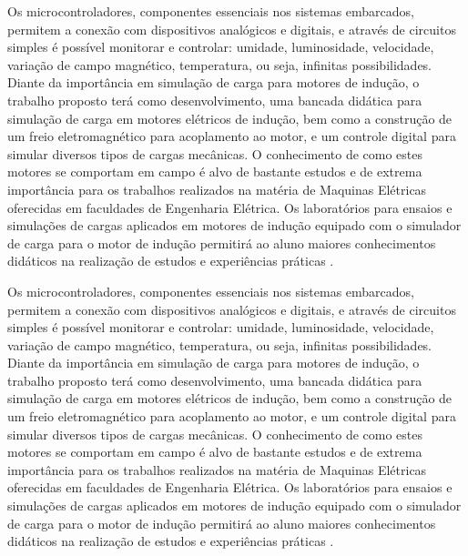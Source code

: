 Os microcontroladores, componentes essenciais nos sistemas embarcados, permitem a conexão com dispositivos analógicos e digitais, e através de circuitos simples é possível monitorar e controlar: umidade, luminosidade, velocidade, variação de campo magnético, temperatura, ou seja, infinitas possibilidades.
Diante da importância em simulação de carga para motores de indução, o trabalho proposto terá como desenvolvimento, uma bancada didática para simulação de carga em motores elétricos de indução, bem como a construção de um freio eletromagnético para acoplamento ao motor, e um controle digital para simular diversos tipos de cargas mecânicas. O conhecimento de como estes motores se comportam em campo é alvo de bastante estudos e de extrema importância para os trabalhos realizados na matéria de Maquinas Elétricas oferecidas em faculdades de Engenharia Elétrica. Os laboratórios para ensaios e simulações de cargas aplicados em motores de indução equipado com o simulador de carga para o motor de indução permitirá ao aluno maiores conhecimentos didáticos na realização de estudos e experiências práticas \cite{Liu:2011}.

Os microcontroladores, componentes essenciais nos sistemas embarcados, permitem a conexão com dispositivos analógicos e digitais, e através de circuitos simples é possível monitorar e controlar: umidade, luminosidade, velocidade, variação de campo magnético, temperatura, ou seja, infinitas possibilidades.
Diante da importância em simulação de carga para motores de indução, o trabalho proposto terá como desenvolvimento, uma bancada didática para simulação de carga em motores elétricos de indução, bem como a construção de um freio eletromagnético para acoplamento ao motor, e um controle digital para simular diversos tipos de cargas mecânicas. O conhecimento de como estes motores se comportam em campo é alvo de bastante estudos e de extrema importância para os trabalhos realizados na matéria de Maquinas Elétricas oferecidas em faculdades de Engenharia Elétrica. Os laboratórios para ensaios e simulações de cargas aplicados em motores de indução equipado com o simulador de carga para o motor de indução permitirá ao aluno maiores conhecimentos didáticos na realização de estudos e experiências práticas \cite{Liu:2011}.